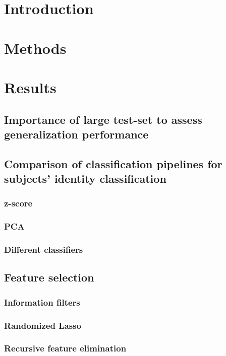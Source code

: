 \documentclass[12pt, a4paper, final, fleqn]{article}
\begin{document}
\newpage
\tableofcontents
\newpage
\section{Introduction}
\label{intro}



\section{Methods}
\label{methods}

\section{Results}
\label{results}

\subsection{Importance of large test-set to assess generalization performance}

\subsection{Comparison of classification pipelines for subjects' identity classification}
\subsubsection{z-score}
\subsubsection{PCA}
\subsubsection{Different classifiers}

\subsection{Feature selection}
\subsubsection{Information filters}
\subsubsection{Randomized Lasso}
\subsubsection{Recursive feature elimination}
\end{document}
